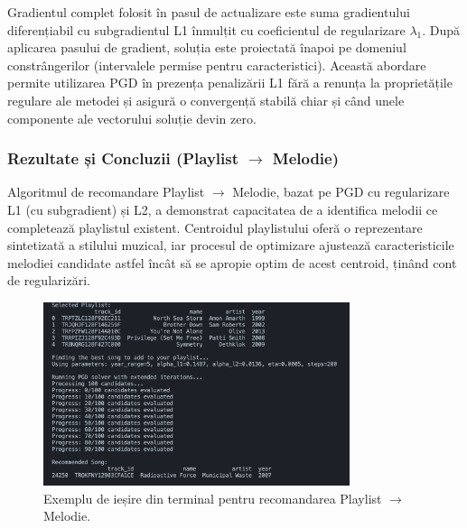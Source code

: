 \documentclass[12pt,a4paper]{article}
\begin{document}
Gradientul complet folosit în pasul de actualizare este suma gradientului diferențiabil cu subgradientul L1 înmulțit cu coeficientul de regularizare \(\lambda_1\).  
După aplicarea pasului de gradient, soluția este proiectată înapoi pe domeniul constrângerilor (intervalele permise pentru caracteristici).
Această abordare permite utilizarea PGD în prezența penalizării L1 fără a renunța la proprietățile regulare ale metodei și asigură o convergență stabilă chiar și când unele componente ale vectorului soluție devin zero.


\subsubsection{Rezultate și Concluzii (Playlist \(\rightarrow\) Melodie)}  
Algoritmul de recomandare Playlist \(\rightarrow\) Melodie, bazat pe PGD cu regularizare L1 (cu subgradient) și L2, a demonstrat capacitatea de a identifica melodii ce completează playlistul existent. Centroidul playlistului oferă o reprezentare sintetizată a stilului muzical, iar procesul de optimizare ajustează caracteristicile melodiei candidate astfel încât să se apropie optim de acest centroid, ținând cont de regularizări.  

\begin{figure}[htbp]
	\centering
	\includegraphics[width=0.8\textwidth]{Data3.png} %
	\caption{Exemplu de ieșire din terminal pentru recomandarea Playlist \(\rightarrow\) Melodie.}
	\label{fig:playlist_to_song_terminal_output}
\end{figure}
\end{document}
